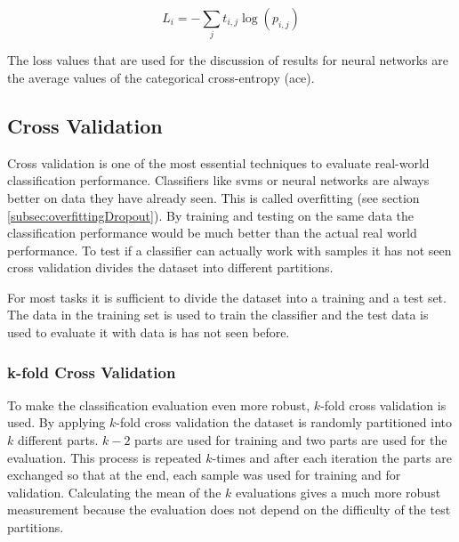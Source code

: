 \begin{equation}
L_i = - \sum_{j} t_{i,j}\log(p_{i,j})
\end{equation} 

The loss values that are used for the discussion of results for neural networks are the average values of the categorical cross-entropy {(\gls{ace})}.

\subsection{Cross Validation}
Cross validation is one of the most essential techniques to evaluate real-world classification performance. Classifiers like \glspl{svm} or neural networks are always better on data they have already seen. This is called overfitting {(see section \ref{subsec:overfittingDropout})}. By training and testing on the same data the classification performance would be much better than the actual real world performance. To test if a classifier can actually work with samples it has not seen cross validation divides the dataset into different partitions. 

For most tasks it is sufficient to divide the dataset into a training and a test set. The data in the training set is used to train the classifier and the test data is used to evaluate it with data is has not seen before.

\subsubsection*{k-fold Cross Validation}
To make the classification evaluation even more robust, $k$-fold cross validation is used. By applying $k$-fold cross validation the dataset is randomly partitioned into $k$ different parts. $k-2$ parts are used for training and two parts are used for the evaluation. This process is repeated $k$-times and after each iteration the parts are exchanged so that at the end, each sample was used for training and for validation. Calculating the mean of the $k$ evaluations gives a much more robust measurement because the evaluation does not depend on the difficulty of the test partitions.
